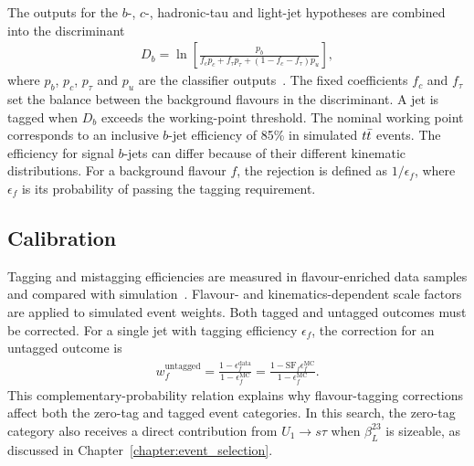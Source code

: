 The outputs for the $b$-, $c$-, hadronic-tau and light-jet hypotheses are combined into the discriminant
\begin{align}
    D_b=\ln\!\left[
    \frac{p_b}{f_c p_c+f_\tau p_\tau+(1-f_c-f_\tau)p_u}
    \right],
    \label{eq:ch6_gn2_discriminant}
\end{align}
where $p_b$, $p_c$, $p_\tau$ and $p_u$ are the classifier outputs~\cite{ATLAS2026GN2}.
The fixed coefficients $f_c$ and $f_\tau$ set the balance between the background flavours in the discriminant.
A jet is tagged when $D_b$ exceeds the working-point threshold.
The nominal working point corresponds to an inclusive $b$-jet efficiency of 85\% in simulated $t\bar{t}$ events.
The efficiency for signal $b$-jets can differ because of their different kinematic distributions.
For a background flavour $f$, the rejection is defined as $1/\epsilon_f$, where $\epsilon_f$ is its probability of passing the tagging requirement.

\subsection{Calibration}

Tagging and mistagging efficiencies are measured in flavour-enriched data samples and compared with simulation~\cite{ATLAS2026GN2}.
Flavour- and kinematics-dependent scale factors are applied to simulated event weights.
Both tagged and untagged outcomes must be corrected.
For a single jet with tagging efficiency $\epsilon_f$, the correction for an untagged outcome is
\begin{align}
    w_f^{\mathrm{untagged}}
    =\frac{1-\epsilon_f^{\mathrm{data}}}{1-\epsilon_f^{\mathrm{MC}}}
    =\frac{1-\mathrm{SF}_f\epsilon_f^{\mathrm{MC}}}{1-\epsilon_f^{\mathrm{MC}}}.
    \label{eq:ch6_btag_untagged}
\end{align}
This complementary-probability relation explains why flavour-tagging corrections affect both the zero-tag and tagged event categories.
In this search, the zero-tag category also receives a direct contribution from $U_1\rightarrow s\tau$ when $\beta_L^{23}$ is sizeable, as discussed in Chapter~\ref{chapter:event_selection}.
